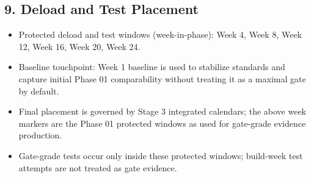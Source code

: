 \documentclass[10pt]{article}
\begin{document}
\begin{landscape}
\subsection*{9. Deload and Test Placement}

\begin{itemize}
\item Protected deload and test windows (week-in-phase): Week 4, Week 8, Week 12, Week 16, Week 20, Week 24.
\item Baseline touchpoint: Week 1 baseline is used to stabilize standards and capture initial Phase 01 comparability without treating it as a maximal gate by default.
\item Final placement is governed by Stage 3 integrated calendars; the above week markers are the Phase 01 protected windows as used for gate-grade evidence production.
\item Gate-grade tests occur only inside these protected windows; build-week test attempts are not treated as gate evidence.
\end{itemize}

\end{landscape}
\end{document}
